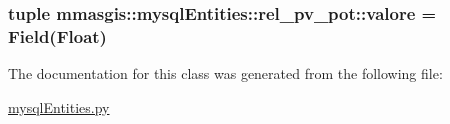 \label{classmmasgis_1_1mysqlEntities_1_1rel__pv__pot_a03b289fa596d71251aa6a80bc2d67690}
\hypertarget{classmmasgis_1_1mysqlEntities_1_1rel__pv__pot_a263160cf0ab8552271779721f166274b}{
\subsubsection[{valore}]{\setlength{\rightskip}{0pt plus 5cm}tuple {\bf mmasgis::mysqlEntities::rel\_\-pv\_\-pot::valore} = Field(Float)}}
\label{classmmasgis_1_1mysqlEntities_1_1rel__pv__pot_a263160cf0ab8552271779721f166274b}


The documentation for this class was generated from the following file:\begin{DoxyCompactItemize}
\item 
\hyperlink{mysqlEntities_8py}{mysqlEntities.py}\end{DoxyCompactItemize}
